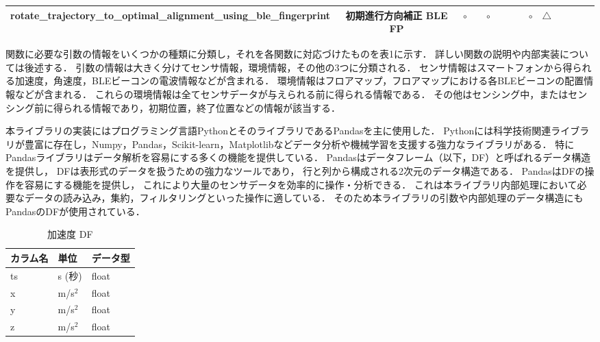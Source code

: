 \begin{table}[ht]
{\begin{tabular}{|c|c|c|c|c|c|c|c|c|c|c|c|c|c|}
	rotate\_trajectory\_to\_optimal\_alignment\_using\_ble\_fingerprint
		& 	初期進行方向補正 BLE FP    		                   & \multicolumn{1}{c|}{$\circ$}                                        &                              & \multicolumn{1}{c|}{$\circ$} &                                                            &                              &                                                                                                               & \multicolumn{1}{c|}{$\circ$} & \multicolumn{1}{c|}{$\triangle$} &                                  &    &                                   \\ \hline
		\end{tabular}
	}
\end{table}




関数に必要な引数の情報をいくつかの種類に分類し，それを各関数に対応づけたものを表1に示す．
詳しい関数の説明や内部実装については後述する．
引数の情報は大きく分けてセンサ情報，環境情報，その他の3つに分類される．
センサ情報はスマートフォンから得られる加速度，角速度，BLEビーコンの電波情報などが含まれる．
環境情報はフロアマップ，フロアマップにおける各BLEビーコンの配置情報などが含まれる．
これらの環境情報は全てセンサデータが与えられる前に得られる情報である．
その他はセンシング中，またはセンシング前に得られる情報であり，初期位置，終了位置などの情報が該当する．

本ライブラリの実装にはプログラミング言語PythonとそのライブラリであるPandasを主に使用した．
Pythonには科学技術関連ライブラリが豊富に存在し，Numpy，Pandas，Scikit-learn，Matplotlibなどデータ分析や機械学習を支援する強力なライブラリがある．
特にPandasライブラリはデータ解析を容易にする多くの機能を提供している．
Pandasはデータフレーム（以下，DF）と呼ばれるデータ構造を提供し，
DFは表形式のデータを扱うための強力なツールであり，
行と列から構成される2次元のデータ構造である．
PandasはDFの操作を容易にする機能を提供し，
これにより大量のセンサデータを効率的に操作・分析できる．
これは本ライブラリ内部処理において必要なデータの読み込み，集約，フィルタリングといった操作に適している．
そのため本ライブラリの引数や内部処理のデータ構造にもPandasのDFが使用されている．

\begin{table}[ht]
	\caption{加速度 DF}
	\centering
	\begin{tabular}{lll}
		\toprule
		カラム名 & 単位        & データ型  \\
		\midrule
		ts   & s (秒)     & float \\
		x    & m/s\(^2\) & float \\
		y    & m/s\(^2\) & float \\
		z    & m/s\(^2\) & float \\
		\bottomrule
	\end{tabular}
\end{table}

